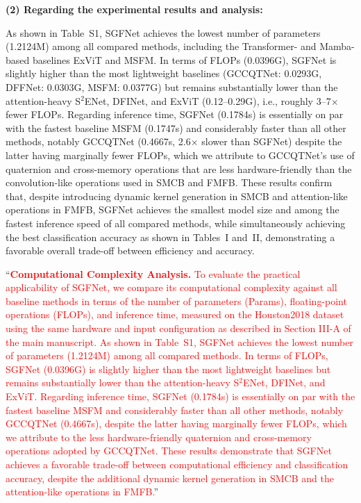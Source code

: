 \textbf{(2) Regarding the experimental results and analysis:}

As shown in Table~S1, SGFNet achieves the lowest number of parameters (1.2124M) among all compared methods, including the Transformer- and Mamba-based baselines ExViT and MSFM. In terms of FLOPs (0.0396G), SGFNet is slightly higher than the most lightweight baselines (GCCQTNet: 0.0293G, DFFNet: 0.0303G, MSFM: 0.0377G) but remains substantially lower than the attention-heavy S$^2$ENet, DFINet, and ExViT (0.12--0.29G), i.e., roughly 3--7$\times$ fewer FLOPs. Regarding inference time, SGFNet (0.1784s) is essentially on par with the fastest baseline MSFM (0.1747s) and considerably faster than all other methods, notably GCCQTNet (0.4667s, 2.6$\times$ slower than SGFNet) despite the latter having marginally fewer FLOPs, which we attribute to GCCQTNet's use of quaternion and cross-memory operations that are less hardware-friendly than the convolution-like operations used in SMCB and FMFB. These results confirm that, despite introducing dynamic kernel generation in SMCB and attention-like operations in FMFB, SGFNet achieves the smallest model size and among the fastest inference speed of all compared methods, while simultaneously achieving the best classification accuracy as shown in Tables~I and~II, demonstrating a favorable overall trade-off between efficiency and accuracy.

``\textbf{\textcolor{red}{Computational Complexity Analysis.}} \textcolor{red}{To evaluate the practical applicability of SGFNet, we compare its computational complexity against all baseline methods in terms of the number of parameters (Params), floating-point operations (FLOPs), and inference time, measured on the Houston2018 dataset using the same hardware and input configuration as described in Section III-A of the main manuscript. As shown in Table~S1, SGFNet achieves the lowest number of parameters (1.2124M) among all compared methods. In terms of FLOPs, SGFNet (0.0396G) is slightly higher than the most lightweight baselines but remains substantially lower than the attention-heavy S$^2$ENet, DFINet, and ExViT. Regarding inference time, SGFNet (0.1784s) is essentially on par with the fastest baseline MSFM and considerably faster than all other methods, notably GCCQTNet (0.4667s), despite the latter having marginally fewer FLOPs, which we attribute to the less hardware-friendly quaternion and cross-memory operations adopted by GCCQTNet. These results demonstrate that SGFNet achieves a favorable trade-off between computational efficiency and classification accuracy, despite the additional dynamic kernel generation in SMCB and the attention-like operations in FMFB.}''

